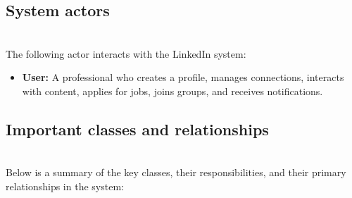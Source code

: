 \subsection{System actors}\label{aE3fDHItKIBwwob4WUN7b}
\\
The following actor interacts with the LinkedIn system:

\begin{itemize}
\item
\protect{}\label{yB2m09hxhJhON89Wq_aWc}
\textbf{User:} A professional who creates a profile, manages connections, interacts with content, applies for jobs, joins groups, and receives notifications.
\end{itemize}

\subsection{Important classes and relationships}\label{rmr6IDrD161XCJ7cZmmVs}
\\
Below is a summary of the key classes, their responsibilities, and their primary relationships in the system:

